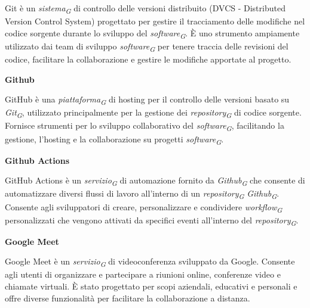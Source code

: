 \documentclass{article}
\begin{document}
Git è un \textit{sistema}\textsubscript{\textit{G}} di controllo delle versioni distribuito (DVCS - Distributed Version Control System) progettato per gestire il tracciamento delle modifiche nel codice sorgente durante lo sviluppo del \textit{software}\textsubscript{\textit{G}}. È uno strumento ampiamente utilizzato dai team di sviluppo \textit{software}\textsubscript{\textit{G}} per tenere traccia delle revisioni del codice, facilitare la collaborazione e gestire le modifiche apportate al progetto.

\vspace{0.4cm}

\textbf{Github}

\vspace{0.1cm}

GitHub è una \textit{piattaforma}\textsubscript{\textit{G}} di hosting per il controllo delle versioni basato su \textit{Git}\textsubscript{\textit{G}}, utilizzato principalmente per la gestione dei \textit{repository}\textsubscript{\textit{G}} di codice sorgente. Fornisce strumenti per lo sviluppo collaborativo del \textit{software}\textsubscript{\textit{G}}, facilitando la gestione, l'hosting e la collaborazione su progetti \textit{software}\textsubscript{\textit{G}}.

\vspace{0.4cm}

\textbf{Github Actions}

\vspace{0.1cm}

GitHub Actions è un \textit{servizio}\textsubscript{\textit{G}} di automazione fornito da \textit{Github}\textsubscript{\textit{G}} che consente di automatizzare diversi flussi di lavoro all'interno di un \textit{repository}\textsubscript{\textit{G}} \textit{Github}\textsubscript{\textit{G}}. Consente agli sviluppatori di creare, personalizzare e condividere \textit{workflow}\textsubscript{\textit{G}} personalizzati che vengono attivati da specifici eventi all'interno del \textit{repository}\textsubscript{\textit{G}}.

\vspace{0.4cm}

\textbf{Google Meet}

\vspace{0.1cm}

Google Meet è un \textit{servizio}\textsubscript{\textit{G}} di videoconferenza sviluppato da Google. Consente agli utenti di organizzare e partecipare a riunioni online, conferenze video e chiamate virtuali. È stato progettato per scopi aziendali, educativi e personali e offre diverse funzionalità per facilitare la collaborazione a distanza. 
\end{document}
